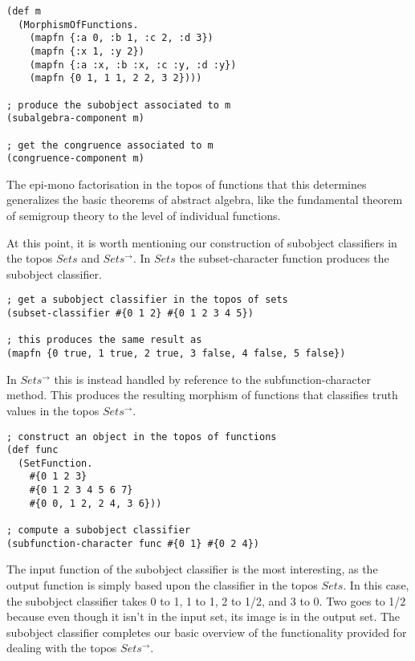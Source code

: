 \documentclass[a4paper,11pt]{report}
\begin{document}
\lstset {language=Lisp}
\begin{lstlisting}
(def m
  (MorphismOfFunctions. 
    (mapfn {:a 0, :b 1, :c 2, :d 3})
    (mapfn {:x 1, :y 2})
    (mapfn {:a :x, :b :x, :c :y, :d :y})
    (mapfn {0 1, 1 1, 2 2, 3 2})))
    
; produce the subobject associated to m
(subalgebra-component m)

; get the congruence associated to m
(congruence-component m)
\end{lstlisting}

The epi-mono factorisation in the topos of functions that this determines generalizes the basic theorems of abstract algebra, like the fundamental theorem of semigroup theory to the level of individual functions.

\newpage 

At this point, it is worth mentioning our construction of subobject classifiers in the topos $Sets$ and $Sets^{\to}$. In $Sets$ the subset-character function produces the subobject classifier.

\lstset {language=Lisp}
\begin{lstlisting}
; get a subobject classifier in the topos of sets
(subset-classifier #{0 1 2} #{0 1 2 3 4 5})

; this produces the same result as
(mapfn {0 true, 1 true, 2 true, 3 false, 4 false, 5 false})
\end{lstlisting}

In $Sets^{\to}$ this is instead handled by reference to the subfunction-character method. This produces the resulting morphism of functions that classifies truth values in the topos $Sets^{\to}$.

\lstset {language=Lisp}
\begin{lstlisting}
; construct an object in the topos of functions
(def func 
  (SetFunction.
    #{0 1 2 3}
    #{0 1 2 3 4 5 6 7}
    #{0 0, 1 2, 2 4, 3 6}))
    
; compute a subobject classifier
(subfunction-character func #{0 1} #{0 2 4})    
\end{lstlisting}

The input function of the subobject classifier is the most interesting, as the output function is simply based upon the classifier in the topos $Sets$. In this case, the subobject classifier takes 0 to 1, 1 to 1, 2 to 1/2, and 3 to 0. Two goes to 1/2 because even though it isn't in the input set, its image is in the output set. The subobject classifier completes our basic overview of the functionality provided for dealing with the topos $Sets^{\to}$. \\
\end{document}
